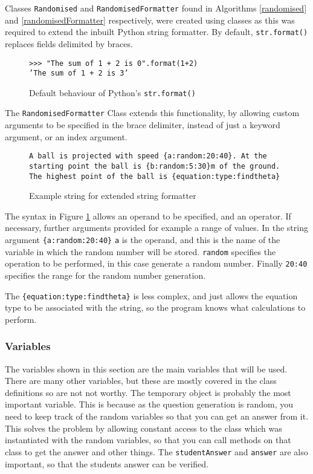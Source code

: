 Classes \texttt{Randomised} and \texttt{RandomisedFormatter} found in Algorithms \ref{randomised} and \ref{randomisedFormatter} respectively, were created using classes as this was required to extend the inbuilt Python string formatter. By default, \texttt{str.format()} replaces fields delimited by braces\autocite{pystr}.
\begin{figure}[H]
	\centering
	\texttt{>>> "The sum of 1 + 2 is {0}".format(1+2)}\\
	\texttt{'The sum of 1 + 2 is 3'}
	\caption{Default behaviour of Python's \texttt{str.format()}\autocite{pystr}}
\end{figure}
The \texttt{RandomisedFormatter} Class extends this functionality, by allowing custom arguments to be specified in the brace delimiter, instead of just a keyword argument, or an index argument. 
\begin{figure}[H]
	\label{exformat}
	\centering
	\texttt{A ball is projected with speed \{a:random:20:40\}. At the starting point the ball is \{b:random:5:30\}m of the ground. The highest point of the ball is \{equation:type:findtheta\}}
	\caption{Example string for extended string formatter}
\end{figure}
The syntax in Figure \ref{exformat} allows an operand to be specified, and an operator. If necessary, further arguments provided for example a range of values. In the string argument \texttt{\{a:random:20:40\}} \texttt{a} is the operand, and this is the name of the variable in which the random number will be stored. \texttt{random} specifies the operation to be performed, in this case generate a random number. Finally \texttt{20:40} specifies the range for the random number generation.

The \texttt{\{equation:type:findtheta\}} is less complex, and just allows the equation type to be associated with the string, so the program knows what calculations to perform.

\subsubsection{Variables}
The variables shown in this section are the main variables that will be used. There are many other variables, but these are mostly covered in the class definitions so are not not worthy. The temporary object is probably the most important variable. This is because as the question generation is random, you need to keep track of the random variables so that you can get an answer from it. This solves the problem by allowing constant access to the class which was instantiated with the random variables, so that you can call methods on that class to get the answer and other things. The \texttt{studentAnswer} and \texttt{answer} are also important, so that the students answer can be verified.
